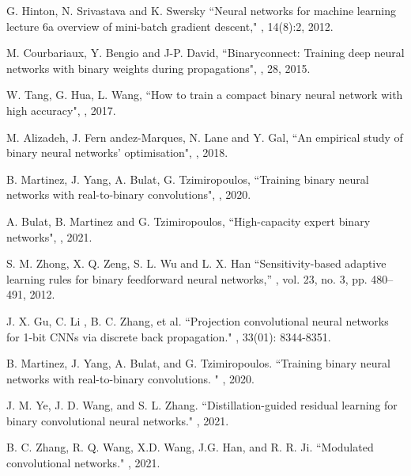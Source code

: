 \documentclass[journal]{IEEEtran}
\begin{document}
\begin{thebibliography}{99}
G. Hinton, N. Srivastava and K. Swersky
\newblock ``Neural networks for machine learning lecture 6a overview of mini-batch gradient descent,"
, 14(8):2, 2012.



 M. Courbariaux,  Y. Bengio and J-P. David,
\newblock ``Binaryconnect: Training deep neural networks with binary weights during propagations",
, 28, 2015.

W. Tang, G. Hua, L. Wang,
\newblock ``How to train a compact binary neural network with high accuracy",
, 2017.


M. Alizadeh,  J. Fern andez-Marques, N. Lane and Y. Gal,
\newblock ``An empirical study of binary neural networks' optimisation",
, 2018.

 B. Martinez, J. Yang, A. Bulat, G. Tzimiropoulos,
\newblock ``Training binary neural networks with real-to-binary convolutions",
, 2020.

A. Bulat, B. Martinez and G. Tzimiropoulos,
\newblock ``High-capacity expert binary networks",
, 2021.

{
S. M. Zhong, X. Q. Zeng, S. L. Wu and L. X. Han
\newblock  ``Sensitivity-based adaptive learning rules for binary feedforward neural networks,''
, vol. 23, no. 3, pp. 480--491, 2012.

J. X. Gu,  C. Li , B. C. Zhang, et al.
\newblock  ``Projection convolutional neural networks for 1-bit CNNs via discrete back propagation."
, 33(01): 8344-8351.

B. Martinez,  J. Yang, A. Bulat, and G. Tzimiropoulos.
\newblock  ``Training binary neural networks with real-to-binary convolutions. "
, 2020.

J. M. Ye, J. D. Wang, and S. L. Zhang.
\newblock  ``Distillation-guided residual learning for binary convolutional neural networks."
, 2021.

B. C. Zhang, R. Q. Wang, X.D. Wang, J.G. Han, and R. R. Ji.
\newblock  ``Modulated convolutional networks."
, 2021.

}
\end{thebibliography}
\end{document}
